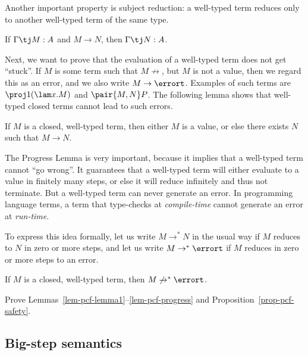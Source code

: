 \documentclass[12pt]{article}
\begin{document}
Another important property is subject reduction: a well-typed term
reduces only to another well-typed term of the same type.

\begin{lemma}
  If $\Gamma\tj M:A$ and $M\to N$, then $\Gamma\tj N:A$. 
\end{lemma}

Next, we want to prove that the evaluation of a well-typed term does
not get ``stuck''. If $M$ is some term such that $M\not\to$, but $M$
is not a value, then we regard this as an error, and we also write
$M\to\errort$. Examples of such terms are $\proj1(\lam x.M)$ and
$\pair{M,N}P$. The following lemma shows that well-typed closed terms
cannot lead to such errors.

\begin{lemma}[Progress]\label{lem-pcf-progress}
  If $M$ is a closed, well-typed term, then either $M$ is a value, or
  else there exists $N$ such that $M\to N$.
\end{lemma}

The Progress Lemma is very important, because it implies that a
well-typed term cannot ``go wrong''. It guarantees that a well-typed
term will either evaluate to a value in finitely many steps, or else
it will reduce infinitely and thus not terminate. But a well-typed
term can never generate an error. In programming language terms, a
term that type-checks at {\em compile-time} cannot generate an error
at {\em run-time}.

To express this idea formally, let us write $M\to^* N$ in the usual
way if $M$ reduces to $N$ in zero or more steps, and let us write
$M\to^*\errort$ if $M$ reduces in zero or more steps to an error.

\begin{proposition}[Safety]\label{prop-pcf-safety}
  If $M$ is a closed, well-typed term, then $M\not\to^*\errort$.
\end{proposition}

\begin{exercise}
  Prove Lemmas~\ref{lem-pcf-lemma1}--\ref{lem-pcf-progress} and
  Proposition~\ref{prop-pcf-safety}.
\end{exercise}

\subsection{Big-step semantics}
\end{document}
